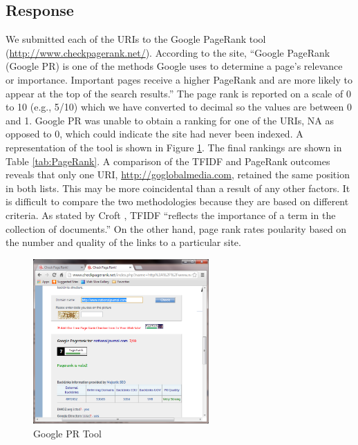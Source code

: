 \documentclass[letterpaper,11pt]{report}
\begin{document}
\begin{savenotes}
\subsection{Response}We submitted each of the URIs to the Google PageRank tool (\url{http://www.checkpagerank.net/}). According to the site, ``Google PageRank (Google PR) is one of the methods Google uses to determine a page's relevance or importance. Important pages receive a higher PageRank and are more likely to appear at the top of the search results.'' The page rank is reported on a scale of 0 to 10 (e.g., 5/10) which we have converted to decimal so the values are between 0 and 1.  Google PR was unable to obtain a ranking for one of the URIs, NA as opposed to 0, which could indicate the site had never been indexed. A representation of the tool is shown in Figure \ref{fig:CheckPageRank}. The final rankings are shown in Table \ref{tab:PageRank}. A comparison of the TFIDF and PageRank outcomes reveals that only one URI, \url{http://goglobalmedia.com}, retained the same position in both lists. This may be more coincidental than a result of any other factors. It is difficult to compare the two methodologies because they are based on different criteria. As stated by Croft \cite{croft2010search}, TFIDF ``reflects the importance of a term in the collection of documents.'' On the other hand, page rank rates poularity based on the number and quality of the links to a particular site.

\begin{figure}[htbp]
	\centering
		\includegraphics[width=0.60\textwidth]{CheckPageRank.png}
	\caption{Google PR Tool}
	\label{fig:CheckPageRank}
\end{figure}



\end{savenotes}
\end{document}
